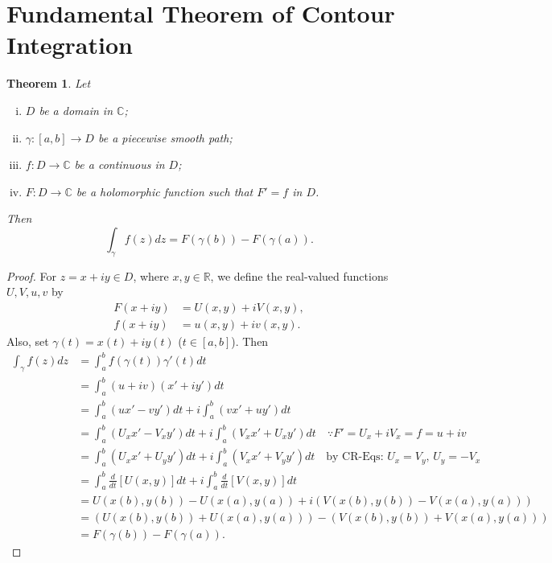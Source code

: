 \documentclass[12pt,openany]{book}
\newtheorem{theorem}{Theorem}[chapter]
\theoremstyle{definition}
\newcommand{\R}{\mathbb{R}}
\newcommand{\C}{\mathbb{C}}
\newcommand{\of}[1]{\left( #1 \right)}
\begin{document}
	\section{Fundamental Theorem of Contour Integration}
	
	\begin{tcolorbox}[colback=white,colframe=thmcolor,arc=5pt,title={\color{white}\bf Fundamental Theorem of Contour Integration}]
		\begin{theorem}
			Let \begin{enumerate}[(i)]
				\item $D$ be a domain in $\C$;
				\item $\gamma:[a,b]\to D$ be a piecewise smooth path;
				\item $f:D\to\C$ be a continuous in $D$;
				\item $F:D\to\C$ be a holomorphic function such that $F'=f$ in $D$.
			\end{enumerate} Then \[
			\int_\gamma f\of{z}dz=F\of{\gamma\of{b}}-F\of{\gamma\of{a}}.
			\]
		\end{theorem}
	\end{tcolorbox}
	\begin{proof}
		For $z=x+iy\in D$, where $x,y\in\R$, we define the real-valued functions $U,V,u,v$ by \begin{align*}
			F(x+iy)&=U(x,y)+iV(x,y),\\
			f(x+iy)&=u(x,y)+iv(x,y).
		\end{align*} Also, set $\gamma\of{t}=x\of{t}+iy\of{t}$ ($t\in[a,b]$). Then
		\begin{align*}
			\int_\gamma f\of{z}dz&=\int_a^bf\of{\gamma\of{t}}\gamma'\of{t}dt\\
			&=\int_a^b\of{u+iv}\of{x'+iy'}dt\\
			&=\int_a^b\of{ux'-vy'}dt +i\int_a^b\of{vx'+uy'}dt\\
			&=\int_a^b\of{U_xx'-V_xy'}dt +i\int_a^b\of{V_xx'+U_xy'}dt\quad\because F'=U_x+iV_x=f=u+iv\\
			&=\int_a^b\of{U_xx'+U_yy'}dt +i\int_a^b\of{V_xx'+V_yy'}dt\quad\text{by CR-Eqs: $U_x=V_y$, $U_y=-V_x$}\\
			&=\int_a^b\frac{d}{dt}\left[U(x,y)\right]dt+i\int_a^b\frac{d}{dt}\left[V(x,y)\right]dt\\
			&=U\of{x(b),y(b)}-U\of{x(a),y(a)}+i\of{V\of{x(b),y(b)}-V\of{x(a),y(a)}}\\
			&=\of{U\of{x(b),y(b)}+U\of{x(a),y(a)}}-\of{V\of{x(b),y(b)}+V\of{x(a),y(a)}}\\
			&=F\of{\gamma\of{b}}-F\of{\gamma\of{a}}.
		\end{align*}
	\end{proof}
	
\end{document}
